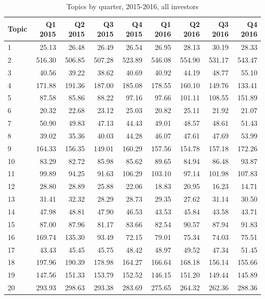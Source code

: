 \begin{table}[]
\caption[Topics by Quarter, 2015-2016, All Investors]{Topics by quarter, 2015-2016, all investors}
			\small
	\begin{tabular}{l|rrrrrrrr}
		Topic & Q1 2015 & Q2 2015 & Q3 2015 & Q4 2015 & Q1 2016 & Q2 2016 & Q3 2016 & Q4 2016 \\
		\hline
		1 & 25.13 & 26.48 & 26.49 & 26.54 & 26.95 & 28.13 & 30.19 & 28.33 \\
		2 & 516.30 & 506.85 & 507.28 & 523.89 & 546.08 & 554.90 & 531.17 & 543.47 \\
		3 & 40.56 & 39.22 & 38.62 & 40.69 & 40.92 & 44.19 & 48.77 & 55.10 \\
		4 & 171.88 & 191.36 & 187.00 & 185.08 & 178.55 & 160.10 & 149.76 & 133.41 \\
		5 & 87.58 & 85.86 & 88.22 & 97.16 & 97.66 & 101.11 & 108.55 & 151.89 \\
		6 & 20.32 & 22.68 & 23.12 & 25.03 & 20.82 & 25.11 & 21.92 & 21.07 \\
		7 & 50.90 & 49.83 & 47.13 & 44.43 & 49.01 & 48.57 & 48.61 & 51.43 \\
		8 & 39.02 & 35.36 & 40.03 & 44.28 & 46.07 & 47.61 & 47.69 & 53.99 \\
		9 & 164.33 & 156.35 & 149.01 & 160.29 & 157.56 & 154.78 & 157.18 & 172.26 \\
		10 & 83.29 & 82.72 & 85.98 & 85.62 & 89.65 & 84.94 & 86.48 & 93.87 \\
		11 & 99.89 & 94.25 & 91.63 & 106.29 & 103.10 & 97.14 & 101.98 & 107.83 \\
		12 & 28.80 & 28.89 & 25.88 & 22.06 & 18.83 & 20.95 & 16.23 & 14.71 \\
		13 & 31.41 & 32.32 & 28.29 & 28.73 & 29.35 & 27.62 & 31.14 & 30.50 \\
		14 & 47.98 & 48.81 & 47.90 & 46.53 & 43.53 & 45.84 & 43.58 & 43.71 \\
		15 & 87.00 & 87.96 & 81.17 & 83.66 & 82.54 & 90.57 & 87.94 & 91.83 \\
		16 & 169.74 & 135.30 & 93.49 & 72.15 & 79.01 & 75.34 & 74.03 & 75.51 \\
		17 & 43.43 & 45.45 & 45.75 & 48.42 & 48.97 & 49.52 & 47.34 & 51.45 \\
		18 & 197.96 & 190.39 & 178.98 & 164.27 & 166.64 & 168.18 & 156.14 & 155.66 \\
		19 & 147.56 & 151.33 & 153.79 & 152.52 & 146.15 & 151.20 & 149.44 & 145.89 \\
		20 & 293.93 & 298.63 & 293.38 & 283.69 & 275.65 & 264.32 & 262.36 & 288.36 \\

\end{tabular}
\end{table}
